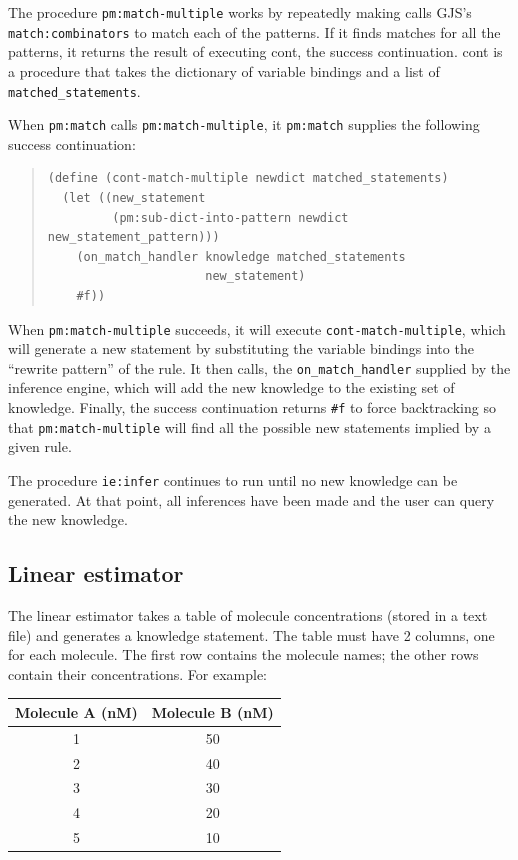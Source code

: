 \documentclass[11pt]{article}
\begin{document}
The procedure \texttt{pm:match-multiple} works by repeatedly making calls GJS's \texttt{match:combinators} to match each of the patterns. If it finds matches for all the patterns, it returns the result of executing cont, the success continuation. cont is a procedure that takes the dictionary of variable bindings and a list of \texttt{matched\_statements}.

When \texttt{pm:match} calls \texttt{pm:match-multiple}, it \texttt{pm:match} supplies the following success continuation:

\begin{quote}
\begin{verbatim}
(define (cont-match-multiple newdict matched_statements)
  (let ((new_statement
         (pm:sub-dict-into-pattern newdict new_statement_pattern)))
    (on_match_handler knowledge matched_statements
                      new_statement)
    #f))
\end{verbatim}
\end{quote}

When \texttt{pm:match-multiple} succeeds, it will execute \texttt{cont-match-multiple}, which will generate a new statement by substituting the variable bindings into the “rewrite pattern” of the rule. It then calls, the \texttt{on\_match\_handler} supplied by the inference engine, which will add the new knowledge to the existing set of knowledge. Finally, the success continuation returns \texttt{\#f} to force backtracking so that \texttt{pm:match-multiple} will find all the possible new statements implied by a given rule.

The procedure \texttt{ie:infer} continues to run until no new knowledge can be generated. At that point, all inferences have been made and the user can query the new knowledge.
\subsection{Linear estimator}
\label{sec-2-5}

The linear estimator takes a table of molecule concentrations (stored in a text file) and generates a knowledge statement. The table must have 2 columns, one for each molecule. The first row contains the molecule names; the other rows contain their concentrations. For example:

\begin{center}
\begin{tabular}{cc}
Molecule A (nM) & Molecule B (nM)\\
\hline
1 & 50\\
2 & 40\\
3 & 30\\
4 & 20\\
5 & 10\\
\end{tabular}
\end{center}
\end{document}
